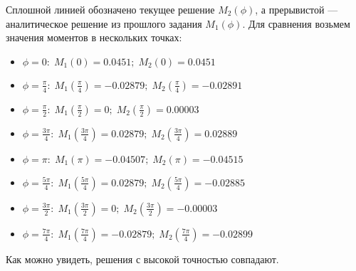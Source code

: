 Сплошной линией обозначено текущее решение $M_2(\phi)$, а прерывистой --- аналитическое решение из прошлого задания $M_1(\phi)$. Для сравнения возьмем значения моментов в нескольких точках:
\begin{itemize}
    \item $\phi = 0: \; M_1(0) = 0.0451; \; M_2(0) = 0.0451$
    \item $\displaystyle \phi = \frac{\pi}{4}: \; M_1(\frac{\pi}{4}) = -0.02879; \; M_2(\frac{\pi}{4}) = -0.02891$
    \item $\displaystyle \phi = \frac{\pi}{2}: \; M_1(\frac{\pi}{2}) = 0; \; M_2(\frac{\pi}{2}) = 0.00003$
    \item $\displaystyle \phi = \frac{3\pi}{4}: \; M_1(\frac{3\pi}{4}) = 0.02879; \; M_2(\frac{3\pi}{4}) = 0.02889$
    \item $\displaystyle \phi = \pi: \; M_1(\pi) = -0.04507; \; M_2(\pi) = -0.04515$
    \item $\displaystyle \phi = \frac{5\pi}{4}: \; M_1(\frac{5\pi}{4}) = 0.02879; \; M_2(\frac{5\pi}{4}) = -0.02885$
    \item $\displaystyle \phi = \frac{3\pi}{2}: \; M_1(\frac{3\pi}{2}) = 0; \; M_2(\frac{3\pi}{2}) = -0.00003$
    \item $\displaystyle \phi = \frac{7\pi}{4}: \; M_1(\frac{7\pi}{4}) = -0.02879; \; M_2(\frac{7\pi}{4}) = -0.02899$
\end{itemize}

Как можно увидеть, решения с высокой точностью совпадают.